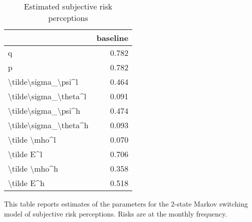 
\begin{table}[p]
\centering
\begin{adjustbox}{width=0.3\textwidth}
\begin{threeparttable}
\caption{Estimated subjective risk perceptions}
\label{tab:PRMarkovEst}\begin{tabular}{lr}
\toprule
{} &  baseline \\
\midrule
q                     &     0.782 \\
p                     &     0.782 \\
\textbackslash tilde\textbackslash sigma\_\textbackslash psi\textasciicircum l   &     0.464 \\
\textbackslash tilde\textbackslash sigma\_\textbackslash theta\textasciicircum l &     0.091 \\
\textbackslash tilde\textbackslash sigma\_\textbackslash psi\textasciicircum h   &     0.474 \\
\textbackslash tilde\textbackslash sigma\_\textbackslash theta\textasciicircum h &     0.093 \\
\textbackslash tilde \textbackslash mho\textasciicircum l         &     0.070 \\
\textbackslash tilde E\textasciicircum l            &     0.706 \\
\textbackslash tilde \textbackslash mho\textasciicircum h         &     0.358 \\
\textbackslash tilde E\textasciicircum h            &     0.518 \\
\bottomrule
\end{tabular}
\begin{tablenotes}\item This table reports estimates of the parameters 
for the 2-state Markov switching model of subjective risk perceptions. Risks are at the monthly frequency. 
\end{tablenotes}
\end{threeparttable}
\end{adjustbox}
\end{table}